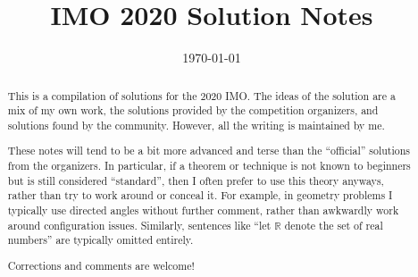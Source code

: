 \documentclass[11pt]{scrartcl}
\title{IMO 2020 Solution Notes}
\date{\today}
\begin{document}
\maketitle

\begin{abstract}
This is a compilation of solutions
for the 2020 IMO.
The ideas of the solution are a mix of my own work,
the solutions provided by the competition organizers,
and solutions found by the community.
However, all the writing is maintained by me.

These notes will tend to be a bit more advanced and terse than the ``official''
solutions from the organizers.
In particular, if a theorem or technique is not known to beginners
but is still considered ``standard'', then I often prefer to
use this theory anyways, rather than try to work around or conceal it.
For example, in geometry problems I typically use directed angles
without further comment, rather than awkwardly work around configuration issues.
Similarly, sentences like ``let $\mathbb{R}$ denote the set of real numbers''
are typically omitted entirely.

Corrections and comments are welcome!
\end{abstract}

\tableofcontents
\newpage

\addtocounter{section}{-1}
\end{document}
